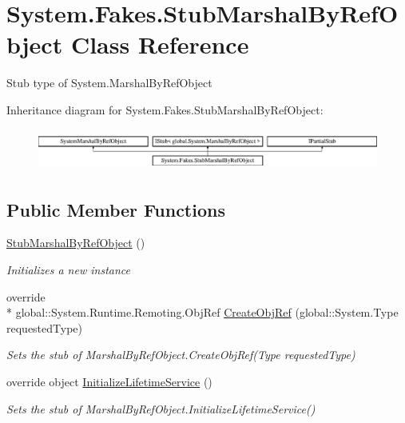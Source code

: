 \hypertarget{class_system_1_1_fakes_1_1_stub_marshal_by_ref_object}{\section{System.\-Fakes.\-Stub\-Marshal\-By\-Ref\-Object Class Reference}
\label{class_system_1_1_fakes_1_1_stub_marshal_by_ref_object}
}


Stub type of System.\-Marshal\-By\-Ref\-Object 


Inheritance diagram for System.\-Fakes.\-Stub\-Marshal\-By\-Ref\-Object\-:\begin{figure}[H]
\begin{center}
\leavevmode
\includegraphics[height=1.377614cm]{class_system_1_1_fakes_1_1_stub_marshal_by_ref_object}
\end{center}
\end{figure}
\subsection*{Public Member Functions}
\begin{DoxyCompactItemize}
\item 
\hyperlink{class_system_1_1_fakes_1_1_stub_marshal_by_ref_object_a063fa24e692995112e93a657b9d0c591}{Stub\-Marshal\-By\-Ref\-Object} ()
\begin{DoxyCompactList}\small\item\em Initializes a new instance\end{DoxyCompactList}\item 
override \\*
global\-::\-System.\-Runtime.\-Remoting.\-Obj\-Ref \hyperlink{class_system_1_1_fakes_1_1_stub_marshal_by_ref_object_ab7f752f2ac772c2bc6bbf310262ed454}{Create\-Obj\-Ref} (global\-::\-System.\-Type requested\-Type)
\begin{DoxyCompactList}\small\item\em Sets the stub of Marshal\-By\-Ref\-Object.\-Create\-Obj\-Ref(\-Type requested\-Type)\end{DoxyCompactList}\item 
override object \hyperlink{class_system_1_1_fakes_1_1_stub_marshal_by_ref_object_a8d0925f298f5dfe9d67618a19abe8667}{Initialize\-Lifetime\-Service} ()
\begin{DoxyCompactList}\small\item\em Sets the stub of Marshal\-By\-Ref\-Object.\-Initialize\-Lifetime\-Service()\end{DoxyCompactList}\end{DoxyCompactItemize}
